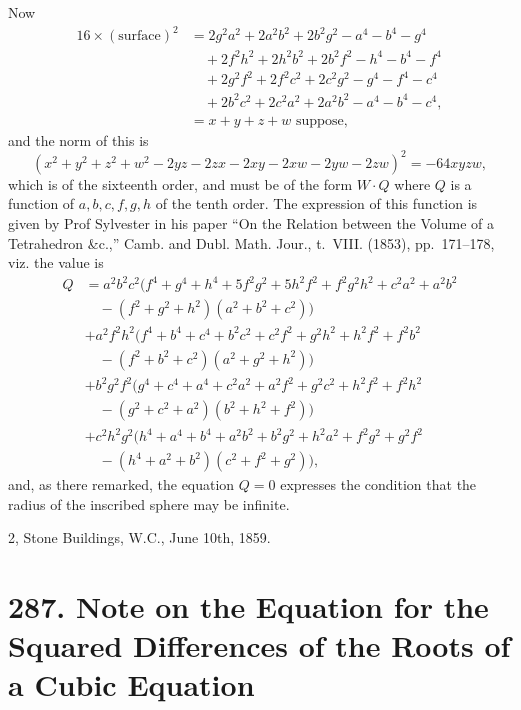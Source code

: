 \documentclass[11pt,a4paper]{book}
\begin{document}
Now
\begin{align*}
16 \times (\text{surface})^2 &= 2g^2a^2 + 2a^2b^2 + 2b^2g^2 - a^4 - b^4 - g^4\\
&\quad + 2f^2h^2 + 2h^2b^2 + 2b^2f^2 - h^4 - b^4 - f^4\\
&\quad + 2g^2f^2 + 2f^2c^2 + 2c^2g^2 - g^4 - f^4 - c^4\\
&\quad + 2b^2c^2 + 2c^2a^2 + 2a^2b^2 - a^4 - b^4 - c^4,\\
&= x + y + z + w\text{ suppose},
\end{align*}
and the norm of this is
\[
(x^2 + y^2 + z^2 + w^2 - 2yz - 2zx - 2xy - 2xw - 2yw - 2zw)^2 = -64xyzw,
\]
which is of the sixteenth order, and must be of the form $W \cdot Q$ where $Q$ is a function of $a, b, c, f, g, h$ of the tenth order. The expression of this function is given by Prof Sylvester in his paper ``On the Relation between the Volume of a Tetrahedron \&c.,'' Camb. and Dubl. Math. Jour., t.~VIII. (1853), pp.~171--178, viz. the value is
\begin{align*}
Q &= a^2b^2c^2(f^4 + g^4 + h^4 + 5f^2g^2 + 5h^2f^2 + f^2g^2h^2 + c^2a^2 + a^2b^2\\
&\quad - (f^2 + g^2 + h^2)(a^2 + b^2 + c^2))\\
&+ a^2f^2h^2(f^4 + b^4 + c^4 + b^2c^2 + c^2f^2 + g^2h^2 + h^2f^2 + f^2b^2\\
&\quad - (f^2 + b^2 + c^2)(a^2 + g^2 + h^2))\\
&+ b^2g^2f^2(g^4 + c^4 + a^4 + c^2a^2 + a^2f^2 + g^2c^2 + h^2f^2 + f^2h^2\\
&\quad - (g^2 + c^2 + a^2)(b^2 + h^2 + f^2))\\
&+ c^2h^2g^2(h^4 + a^4 + b^4 + a^2b^2 + b^2g^2 + h^2a^2 + f^2g^2 + g^2f^2\\
&\quad - (h^4 + a^2 + b^2)(c^2 + f^2 + g^2)),
\end{align*}
and, as there remarked, the equation $Q = 0$ expresses the condition that the radius of the inscribed sphere may be infinite.

\hfill 2, Stone Buildings, W.C., June 10th, 1859.


\newpage
\section*{287. Note on the Equation for the Squared Differences of the Roots of a Cubic Equation}
\label{sec:287}
\end{document}
